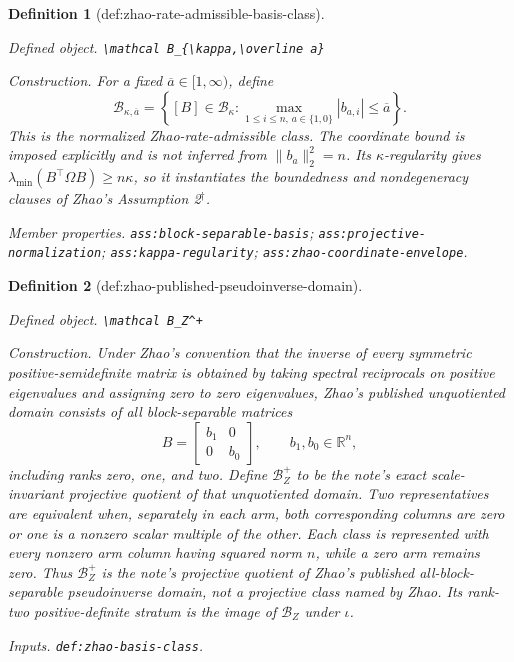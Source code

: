 \documentclass{article}
\newtheorem{definition}{Definition}
\begin{document}
\begin{definition}[def:zhao-rate-admissible-basis-class]\label{def:zhao-rate-admissible-basis-class}
\par\smallskip\noindent\emph{Defined object.} \texttt{\textbackslash{}\allowbreak{}mathcal B\_\allowbreak{}\{\textbackslash{}\allowbreak{}kappa,\allowbreak{}\textbackslash{}\allowbreak{}overline a\}\allowbreak{}}
\par\smallskip\noindent\emph{Construction.} For a fixed \(\overline a\in[1,\infty)\), define
\[
\mathcal B_{\kappa,\overline a}
=\left\{[B]\in\mathcal B_\kappa:
\max_{1\le i\le n,\,a\in\{1,0\}}|b_{a,i}|\le\overline a\right\}.
\]
This is the normalized Zhao-rate-admissible class.  The coordinate bound is imposed explicitly and is not inferred from \(\lVert b_a\rVert_2^2=n\).  Its \(\kappa\)-regularity gives \(\lambda_{\min}(B^{\top}\Omega B)\ge n\kappa\), so it instantiates the boundedness and nondegeneracy clauses of Zhao's Assumption 2\(^{\dagger}\).
\par\smallskip\noindent\emph{Member properties.} \texttt{ass:\allowbreak{}block-\allowbreak{}separable-\allowbreak{}basis}; \texttt{ass:\allowbreak{}projective-\allowbreak{}normalization}; \texttt{ass:\allowbreak{}kappa-\allowbreak{}regularity}; \texttt{ass:\allowbreak{}zhao-\allowbreak{}coordinate-\allowbreak{}envelope}.
\end{definition}

\begin{definition}[def:zhao-published-pseudoinverse-domain]\label{def:zhao-published-pseudoinverse-domain}
\par\smallskip\noindent\emph{Defined object.} \texttt{\textbackslash{}\allowbreak{}mathcal B\_\allowbreak{}Z\textasciicircum{}+\allowbreak{}}
\par\smallskip\noindent\emph{Construction.} Under Zhao's convention that the inverse of every symmetric positive-semidefinite matrix is obtained by taking spectral reciprocals on positive eigenvalues and assigning zero to zero eigenvalues, Zhao's published unquotiented domain consists of all block-separable matrices
\[
B=\begin{bmatrix}b_1&0\\0&b_0\end{bmatrix},\qquad b_1,b_0\in\mathbb R^n,
\]
including ranks zero, one, and two.  Define \(\mathcal B_Z^+\) to be the note's exact scale-invariant projective quotient of that unquotiented domain.  Two representatives are equivalent when, separately in each arm, both corresponding columns are zero or one is a nonzero scalar multiple of the other.  Each class is represented with every nonzero arm column having squared norm \(n\), while a zero arm remains zero.  Thus \(\mathcal B_Z^+\) is the note's projective quotient of Zhao's published all-block-separable pseudoinverse domain, not a projective class named by Zhao.  Its rank-two positive-definite stratum is the image of \(\mathcal B_Z\) under \(\iota\).
\par\smallskip\noindent\emph{Inputs.} \texttt{def:\allowbreak{}zhao-\allowbreak{}basis-\allowbreak{}class}.
\end{definition}
\end{document}
